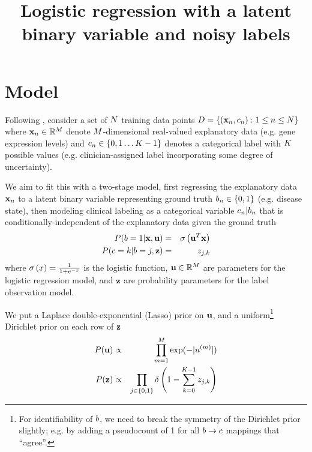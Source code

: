 \documentclass{article}
\begin{document}

\title{Logistic regression with a latent binary variable and noisy labels}

\maketitle

\section{Model}

Following \cite{BootkrajangKaban2012},
consider a set of $N$ training data points
$D = \left\{ ({\bf x}_{n},c_{n}): 1 \leq n \leq N \right\}$
where
${\bf x}_n \in \mathbb{R}^M$
denote $M$-dimensional real-valued explanatory data (e.g. gene expression levels)
and
$c_n \in \left\{ 0, 1 \ldots K - 1 \right\}$
denotes a categorical label with $K$ possible values
(e.g. clinician-assigned label incorporating some degree of uncertainty).

We aim to fit this with a two-stage model,
first regressing the explanatory data ${\bf x}_n$ to a latent binary variable representing ground truth
$b_n \in \left\{ 0, 1 \right\}$
(e.g. disease state),
then modeling clinical labeling as a categorical variable $c_n | b_n$
that is conditionally-independent of the explanatory data given the ground truth
\begin{eqnarray*}
P(b = 1 | {\bf x}, {\bf u}) & = & \sigma\left({\bf u}^T {\bf x}\right) \\
P(c = k | b = j, {\bf z}) & = & z_{j,k}
\end{eqnarray*}
where
$\sigma\left(x\right) = \frac{1}{1+e^{-x}}$ is the logistic function,
${\bf u} \in \mathbb{R}^M$ are parameters for the logistic regression model, and
${\bf z}$ are probability parameters for the label observation model.

We put a Laplace double-exponential (Lasso) prior on ${\bf u}$, and a uniform\footnote{
  For identifiability of $b$, we need to break the symmetry of the Dirichlet prior slightly;
  e.g. by adding a pseudocount of 1 for all $b \to c$ mappings that ``agree''.
} Dirichlet prior on each row of ${\bf z}$
\begin{eqnarray*}
P({\bf u}) & \propto & \prod_{m=1}^{M} \exp(-|u^{(m)}|) \\
P({\bf z}) & \propto & \prod_{j \in \{0,1\}} \delta \left( 1 - \sum_{k=0}^{K-1} z_{j,k} \right)
\end{eqnarray*}
\end{document}
